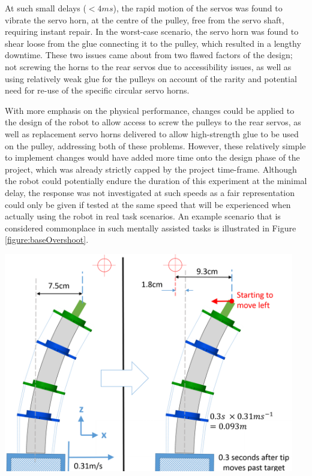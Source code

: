 \documentclass[11pt]{article}
\begin{document}
At such small delays ($<4ms$), the rapid motion of the servos was found to vibrate the servo horn, at the centre of the pulley, free from the servo shaft, requiring instant repair. In the worst-case scenario, the servo horn was found to shear loose from the glue connecting it to the pulley, which resulted in a lengthy downtime. These two issues came about from two flawed factors of the design; not screwing the horns to the rear servos due to accessibility issues, as well as using relatively weak glue for the pulleys on account of the rarity and potential need for re-use of the specific circular servo horns.  

With more emphasis on the physical performance, changes could be applied to the design of the robot to allow access to screw the pulleys to the rear servos, as well as replacement servo horns delivered to allow high-strength glue to be used on the pulley, addressing both of these problems. However, these relatively simple to implement changes would have added more time onto the design phase of the project, which was already strictly capped by the project time-frame. Although the robot could potentially endure the duration of this experiment at the minimal delay, the response was not investigated at such speeds as a fair representation could only be given if tested at the same speed that will be experienced when actually using the robot in real task scenarios. An example scenario that is considered commonplace in such mentally assisted tasks is illustrated in Figure \ref{figure:baseOvershoot}.

\begin{center}
\includegraphics[width=0.95\textwidth]{images/baseOvershoot.png}
\label{figure:baseOvershoot}
\end{center}
\end{document}

